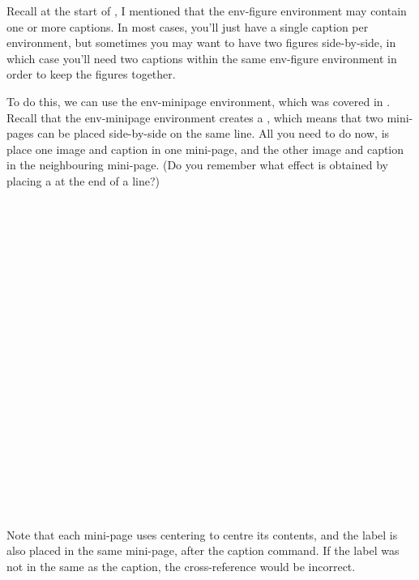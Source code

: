 Recall at the start of , I mentioned that
the \gls{env-figure} environment may contain one or more captions.
In most cases, you'll just have a single caption per
 environment, but sometimes you may want to have
two figures side-by-side, in which case you'll need two captions
within the same \gls{env-figure} environment in order to keep the
figures together.

To do this, we can use the 
\gls{env-minipage} environment, which was covered 
in . Recall that 
the \gls*{env-minipage} environment creates a 
, which means that two mini-pages can
be placed side-by-side on the same line. All you need to do 
now, is place one image and caption in one mini-page, and the
other image and caption in the neighbouring mini-page. (Do you remember what effect is obtained
by placing a  at the end of a
line?)\bookpagebreak
\begin{code}
\newline
\strut~\newline
\strut~~\newline
\strut~~\newline
\strut~~\newline
\strut~~\newline
\strut~\newline
\strut~\newline
\strut~~\newline
\strut~~\newline
\strut~~\newline
\strut~~\newline
\strut~\newline
{}
\end{code}%
Note that each
mini-page uses \gls{centering} to centre its contents, and the
label is also placed in the same mini-page, after the
\gls{caption} command. If the \gls{label} was not in the same
 as the \gls{caption}, the
cross-reference would be incorrect.

